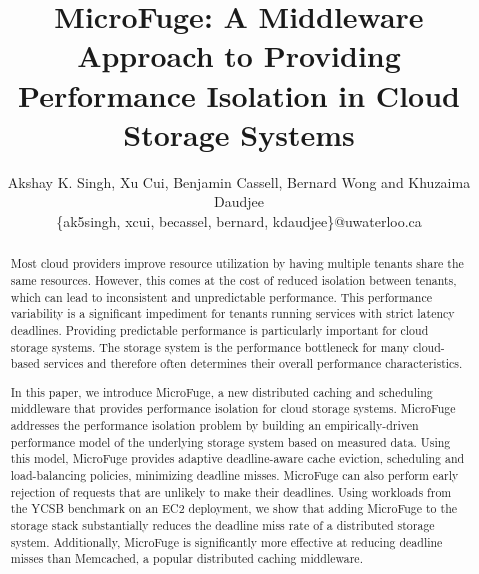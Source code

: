 \documentclass[letterpaper]{article}
\newcommand{\ycsb}{{YCSB}\xspace}
\newcommand{\lpaper}{{MicroFuge}\xspace}
\newcommand{\memcached}{{Memcached}\xspace}
\begin{document}
\title{MicroFuge: A Middleware Approach to Providing Performance Isolation in
  Cloud Storage Systems}%

\author{Akshay K. Singh, Xu Cui, Benjamin Cassell, Bernard Wong and Khuzaima Daudjee\\
  \{ak5singh, xcui, becassel, bernard, kdaudjee\}@uwaterloo.ca}

\date{}
\maketitle%


\begin{abstract}

Most cloud providers improve resource utilization by having multiple tenants
share the same resources. However, this comes at the cost of reduced isolation
between tenants, which can lead to inconsistent and unpredictable performance.
This performance variability is a significant impediment for tenants running
services with strict latency deadlines.  Providing predictable performance is
particularly important for cloud storage systems. The storage system is the
performance bottleneck for many cloud-based services and therefore often
determines their overall performance characteristics.

In this paper, we introduce \lpaper, a new distributed caching and scheduling
middleware that provides performance isolation for cloud storage systems.
\lpaper addresses the performance isolation problem by building an
empirically-driven performance model of the underlying storage system based on
measured data.  Using this model, \lpaper provides adaptive deadline-aware
cache eviction, scheduling and load-balancing policies, minimizing deadline
misses.  \lpaper can also perform early rejection of requests that are unlikely
to make their deadlines. Using workloads from the \ycsb benchmark on an EC2
deployment, we show that adding \lpaper to the storage stack substantially
reduces the deadline miss rate of a distributed storage system. Additionally,
\lpaper is significantly more effective at reducing deadline misses than
\memcached, a popular distributed caching middleware.

\end{abstract}
\end{document}
